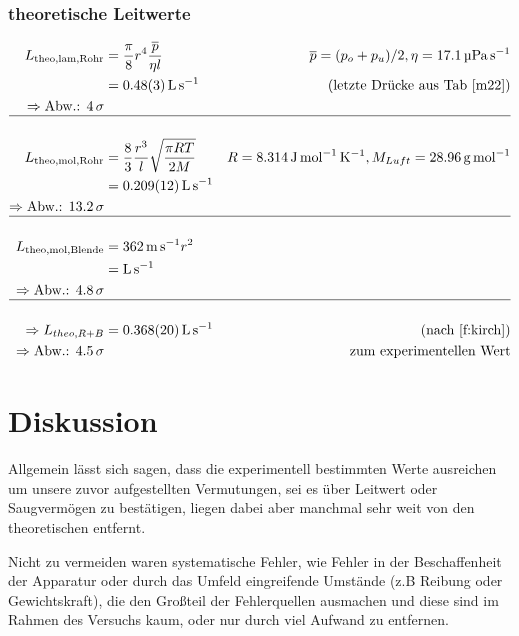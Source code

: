 \documentclass[12pt, a4paper]{scrartcl}
\begin{document}
        \subsubsection*{theoretische Leitwerte}
        
        \begin{align}
        	L_{\text{theo,lam,Rohr}}&=\frac{\pi}{8} r^4 \frac{\overline p}{\eta l}&\overline p = (p_o+p_u)/2, \eta= 
        	\SI{17.1}{\micro\pascal\per\second}\\
        	&= \SI{0.48+-0.03}{\litre\per\second} &\text{(letzte Drücke aus Tab \ref{m22})}\\
        	\Rightarrow \text{Abw.: } \SI{4}{\sigma}\\
        	\hline\nonumber\\
        	L_{\text{theo,mol,Rohr}}&=\frac 8 3 \frac{r^3}{l} \sqrt{\frac{\pi R T}{2 M}} &R=\SI{8.314}{\joule\per\mole\per\kelvin}, M_{Luft} = \SI{28.96}{\gram\per\mole}\\
        	&=\SI{.209+-.012}{\litre\per\second}\\
        	\Rightarrow \text{Abw.: } \SI{13.2}{\sigma}\\
        	\hline\nonumber\\
        	L_{\text{theo,mol,Blende}}
        	&=\SI{362}{\meter\per\second} r^2\\
        	&=\SI{}{\litre\per\second}\\
        	\Rightarrow \text{Abw.: } \SI{4.8}{\sigma}\\
        	\hline\nonumber\\
        	\Rightarrow L_{theo,R+B} 
        	&= \SI{.368+-.02}{\litre\per\second}
        	&(\text{nach }\ref{f:kirch})\\
        	\Rightarrow \text{Abw.: \SI{4.5}{\sigma}}&&\text{zum experimentellen Wert}
        \end{align}
	
	\section{Diskussion}
		Allgemein lässt sich sagen, dass die experimentell bestimmten Werte ausreichen um unsere zuvor aufgestellten Vermutungen, sei es über Leitwert oder Saugvermögen zu bestätigen, liegen dabei aber manchmal sehr weit von den theoretischen entfernt.
		
		Nicht zu vermeiden waren systematische Fehler, wie Fehler in der Beschaffenheit der Apparatur oder durch das Umfeld eingreifende Umstände (z.B Reibung oder Gewichtskraft), die den Großteil der Fehlerquellen ausmachen und diese sind im Rahmen des Versuchs kaum, oder nur durch viel Aufwand zu entfernen.
	
\end{document}
